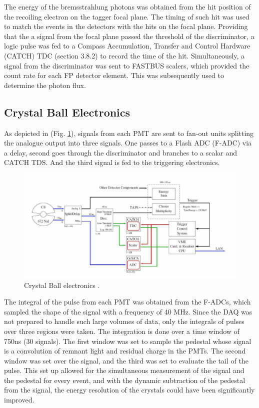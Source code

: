 \indent The energy of the bremsstrahlung photons was obtained from the hit position of the recoiling electron on the tagger focal plane. The timing of such hit was used to match the events in the detectors with the hits on the focal plane. Providing that the a signal from the focal plane passed the threshold of the discriminator, a logic pulse was fed to a Compass Accumulation, Transfer and Control Hardware (CATCH) TDC (section 3.8.2) to record the time of the hit. Simultaneously, a signal from the discriminator was sent to FASTBUS scalers, which provided the count rate for each FP detector element. This was subsequently used to determine the photon flux.

\subsection{Crystal Ball Electronics}

\indent As depicted in (Fig. \ref{cbelectronics}), signals from each PMT are sent to fan-out units splitting the analogue output into three signals. One passes to a Flash ADC (F-ADC) via a delay, second goes through the discriminator and branches to a scalar and CATCH TDS. And the third signal is fed to the triggering electronics.

\begin{figure}[H]
\begin{center}
\includegraphics[scale=1.0]{pictures/png/cbelectronics.png}
\caption{Crystal Ball electronics \cite{krambrich}.}
\label{cbelectronics}
\end{center}
\end{figure}

\indent The integral of the pulse from each PMT was obtained from the F-ADCs, which sampled the shape of the signal with a frequency of 40 MHz. Since the DAQ was not prepared to handle such large volumes of data, only the integrals of pulses over three regions were taken. The integration is done over a time window of 750ns (30 signals). The first window was set to sample the pedestal whose signal is a convolution of remnant light and residual charge in the PMTs. The second window was set over the signal, and the third was set to evaluate the tail of the pulse. This set up allowed for the simultaneous measurement of the signal and the pedestal for every event, and with the dynamic subtraction of the pedestal from the signal, the energy resolution of the crystals could have been significantly improved.

